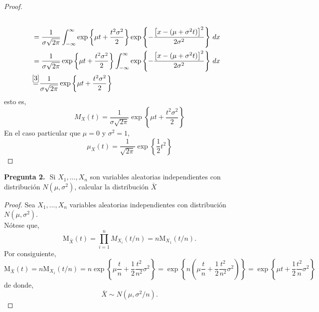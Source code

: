 \documentclass[12pt,legalpaper]{report}
\theoremstyle{plain} \newtheorem{teo}{Teorema}[chapter]
\theoremstyle{definition} \newtheorem{Def}[teo]{Definici\'on}
\begin{document}
\begin{proof}
\begin{align*}
\\&=\frac{1}{\sigma\sqrt{2\pi}}\int_{-\infty}^{\infty}\exp\left\{\mu t+\frac{t^{2}\sigma^{2}}{2}\right\}\exp\left\{-\frac{\left[x-(\mu+\sigma^{2}t)\right]^{2}}{{2\sigma^{2}}}\right\}\,dx
\\&=\frac{1}{\sigma\sqrt{2\pi}}\exp\left\{\mu t+\frac{t^{2}\sigma^{2}}{2}\right\}\int_{-\infty}^{\infty}\exp\left\{-\frac{\left[x-(\mu+\sigma^{2}t)\right]^{2}}{{2\sigma^{2}}}\right\}\,dx
\\&{\stackrel{\ref{3}}{=}}\frac{1}{\sigma\sqrt{2\pi}}\exp\left\{\mu t+\frac{t^{2}\sigma^{2}}{2}\right\}
\end{align*}
esto es,
\begin{equation*}
M_{X}(t)=\frac{1}{\sigma\sqrt{2\pi}}\exp\left\{\mu t + \frac{t^{2}\sigma^{2}}{2}\right\}
\end{equation*}
En el caso particular que $\mu=0$ y $\sigma^{2}=1$,
\begin{equation*}
\mu_{X}(t)=\frac{1}{\sqrt{2\pi}}\exp\left\{\frac{1}{2}t^{2}\right\}
\end{equation*}
\end{proof}


\vspace{1cm}
\noindent\textbf{Pregunta 2.}\,\, Si $X_{1},...,X_{n}$ son variables aleatorias independientes con distribuci\'on $N(\mu,\sigma^{2})$, calcular la distribuci\'on $\bar{X}$
\begin{proof}
Sea $X_{1},...,X_{n}$ variables aleatorias independientes con distribuci\'on $N(\mu,\sigma^{2})$.\\
N\'otese que,
\begin{equation*}
\displaystyle \mathrm{M}_{\bar{X}}(t)=\prod_{i=1}^{n}M_{X_{i}}(t/n)=n\mathrm{M}_{X_{1}}(t/n).
\end{equation*}
Por consiguiente,
\begin{equation*}
\mathrm{M}_{\bar{X}}(t)=n\mathrm{M}_{X_{1}}(t/n)=n\exp\left\{\mu\frac{t}{n}+\frac{1}{2}\frac{t^{2}}{n^{2}}\sigma^{2}\right\}
=\exp\left\{n\left(\mu\frac{t}{n}+\frac{1}{2}\frac{t^{2}}{n^{2}}\sigma^{2}\right)\right\}
=\exp\left\{\mu t+\frac{1}{2}\frac{t^{2}}{n}\sigma^{2}\right\}
\end{equation*}
de donde,
\begin{equation*}
\bar{X}\sim N(\mu,\sigma^{2}/n).
\end{equation*}
\end{proof}
\end{document}
